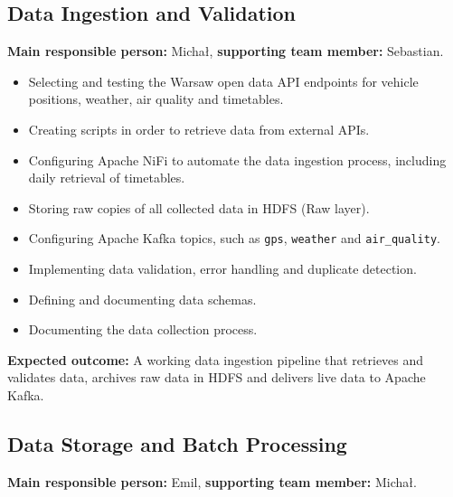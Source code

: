 \documentclass[11pt]{article}
\begin{document}
\subsection{Data Ingestion and Validation}

\textbf{Main responsible person:} Michał, \textbf{supporting team member:} Sebastian.

\begin{itemize}
    \item Selecting and testing the Warsaw open data API endpoints for vehicle positions, weather, air quality and timetables.
    \item Creating scripts in order to retrieve data from external APIs.
    \item Configuring Apache NiFi to automate the data ingestion process, including daily retrieval of timetables.
    \item Storing raw copies of all collected data in HDFS (Raw layer).
    \item Configuring Apache Kafka topics, such as \texttt{gps}, \texttt{weather} and \texttt{air\_quality}.
    \item Implementing data validation, error handling and duplicate detection.
    \item Defining and documenting data schemas.
    \item Documenting the data collection process.
\end{itemize}
\textbf{Expected outcome:} A working data ingestion pipeline that retrieves and validates data, archives raw data in HDFS and delivers live data to Apache Kafka.

\subsection{Data Storage and Batch Processing}

\textbf{Main responsible person:} Emil, \textbf{supporting team member:} Michał.
\end{document}
